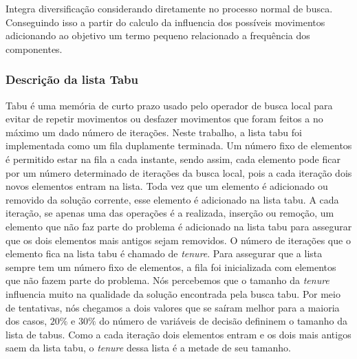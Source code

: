 \documentclass[12pt,a4paper]{article}
\begin{document}
        Integra diversificação considerando diretamente no processo normal de busca. Conseguindo isso a partir do calculo da influencia dos possíveis movimentos adicionando ao objetivo um termo pequeno
        relacionado a frequência dos componentes.

    \subsubsection{Descrição da lista Tabu}

        Tabu é uma memória de curto prazo usado pelo operador de busca local para evitar de repetir movimentos ou desfazer movimentos que foram feitos a no máximo um dado número de iterações. Neste
        trabalho, a lista tabu foi implementada como um fila duplamente terminada. Um número fixo de elementos é permitido estar na fila a cada instante, sendo assim, cada elemento pode ficar por um
        número determinado de iterações da busca local, pois a cada iteração dois novos elementos entram na lista. Toda vez que um elemento é adicionado ou removido da solução corrente, esse
        elemento é adicionado na lista tabu. A cada iteração, se apenas uma das operações é a realizada, inserção ou remoção, um elemento que não faz parte do problema é adicionado na lista tabu
        para assegurar que os dois elementos mais antigos sejam removidos. O número de iterações que o elemento fica na lista tabu é chamado de \textit{tenure}. Para assegurar que a lista sempre tem
        um número fixo de elementos, a fila foi inicializada com elementos que não fazem parte do problema. Nós percebemos que o tamanho da \textit{tenure} influencia muito na qualidade da solução
        encontrada pela busca tabu. Por meio de tentativas, nós chegamos a dois valores que se saíram melhor para a maioria dos casos, $20\%$ e $30\%$ do número de variáveis de decisão defininem o
        tamanho da lista de tabus. Como a cada iteração dois elementos entram e os dois mais antigos saem da lista tabu, o \textit{tenure} dessa lista é a metade de seu tamanho.
\end{document}
